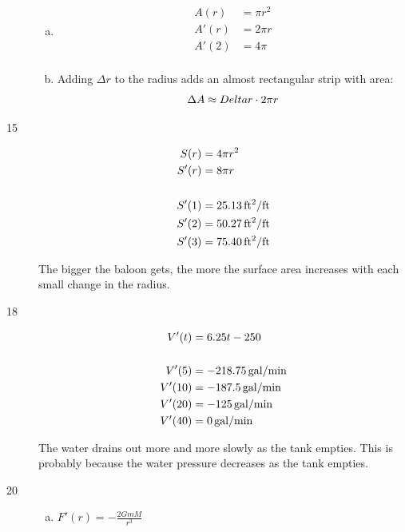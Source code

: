\documentclass[letterpaper, landscape]{exam}
\begin{document}
\begin{description}
\begin{enumerate}[(a)]
        \item 
          \begin{align*}
            A(r)  & = \pi r^2 \\
            A'(r) & = 2 \pi r \\
            A'(2) & = 4 \pi \\
          \end{align*}

        \item Adding $\Delta r$ to the radius adds an almost rectangular strip with area:
          \[
            \Delta A \approx Delta r \cdot 2 \pi r \\
          \]
      \end{enumerate}

    \item[15]
      \begin{align*}
        S(r) &= 4 \pi r^2 \\
        S'(r) &= 8 \pi r \\
        \\
        S'(1) &= \unit[25.13]{ft^2/ft} \\
        S'(2) &= \unit[50.27]{ft^2/ft} \\
        S'(3) &= \unit[75.40]{ft^2/ft} \\
      \end{align*}

      The bigger the baloon gets, the more the surface area increases with each
      small change in the radius.

    \item[18]
      \begin{align*}
        V'(t)  & = 6.25t - 250 \\
        \\
        V'(5)  & = \unit[-218.75]{gal/min} \\
        V'(10) & = \unit[-187.5]{gal/min} \\
        V'(20) & = \unit[-125]{gal/min} \\
        V'(40) & = \unit[0]{gal/min} \\
      \end{align*}

      The water drains out more and more slowly as the tank empties. This is probably because
      the water pressure decreases as the tank empties.

    \item[20]
      \begin{enumerate}[(a)]
        \item $F'(r) = -\frac{2 G m M}{r^3}$


\end{enumerate}
\end{description}
\end{document}
